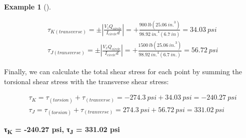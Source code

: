 \documentclass[
  letterpaper,
  DIV=11,
  numbers=noendperiod]{scrreprt}
\theoremstyle{definition}
\newtheorem{example}{Example}[chapter]
\theoremstyle{remark}
\begin{document}
\begin{tcolorbox}
\begin{example}[]
\begin{tcolorbox}
\[
\begin{aligned}
& \tau_{K(transverse)}= \pm\left|\frac{V_z Q_{circle}}{I_{circle} d}\right|=+\frac{900{~lb}(25.06{~in.}^3)}{98.92{~in.}^4(6.7 {~in})}=34.03{~psi} \\
& \tau_{J(transverse)}= \pm\left|\frac{V_x Q_{circle}}{I_{circle} d}\right|=+\frac{1500{~lb}(25.06{~in.}^3)}{98.92{~in.}^4(6.7 {~in.})}=56.72{~psi}
\end{aligned}
\]

Finally, we can calculate the total shear stress for each point by
summing the torsional shear stress with the transverse shear stress:

\[
\begin{aligned}
& \tau_K=\tau_{(torsion)}+\tau_{(tranverse)}=-274.3{~psi}+34.03{~psi}=-240.27{~psi} \\
& \tau_J=\tau_{(torsion)}+\tau_{(tranverse)}=274.3{~psi}+56.72{~psi}=331.02{~psi}
\end{aligned}
\]

\textbf{τ\textsubscript{K} = -240.27 psi, τ\textsubscript{J} = 331.02
psi}

\end{tcolorbox}

\end{example}

\end{tcolorbox}
\end{document}
